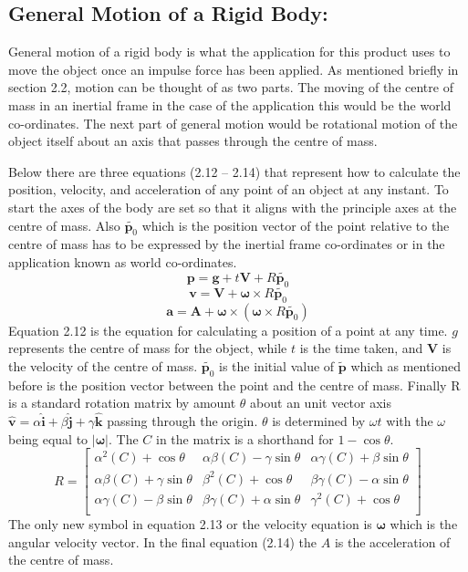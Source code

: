 \subsection{General Motion of a Rigid Body:}
General motion of a rigid body is what the application for this product uses to move the object once an impulse force has been applied.
As mentioned briefly in section 2.2, motion can be thought of as two parts.
The moving of the centre of mass in an inertial frame in the case of the application this would be the world co-ordinates.
The next part of general motion would be rotational motion of the object itself about an axis that passes through the centre of mass. 

Below there are three equations (2.12 – 2.14) that represent how to calculate the position, velocity, and acceleration of any point of an object at any instant.
To start the axes of the body are set so that it aligns with the principle axes at the centre of mass.
Also $\tilde{\mathbf{p}_{0}}$ which is the position vector of the point relative  to the centre of mass has to be expressed by the inertial frame co-ordinates or in the application known as world co-ordinates.
\begin{equation}
\mathbf{p}=\mathbf{g}+t\mathbf{V}+{R}\tilde{\mathbf{p}_{0}}
\end{equation}
\begin{equation}
\mathbf{v}=\mathbf{V}+\boldsymbol\omega\times{R}\tilde{\mathbf{p}_{0}}
\end{equation}
\begin{equation}
\mathbf{a}=\mathbf{A}+\boldsymbol\omega\times(\boldsymbol\omega\times{R}\tilde{\mathbf{p}_{0}})
\end{equation}
Equation 2.12 is the equation for calculating a position of a point at any time. $g$ represents the centre of mass for the object, while $t$ is the time taken, and $\mathbf{V}$ is the velocity of the centre of mass. $\tilde{\mathbf{p}_{0}}$ is the initial value of $\tilde{\mathbf{p}}$ which as mentioned before is the position vector between the point and the centre of mass.
Finally R is a standard rotation matrix by amount $\theta$ about an unit vector axis $\hat{\mathbf{v}} = \alpha\hat{\mathbf{i}} + \beta\hat{\mathbf{j}} + \gamma\hat{\mathbf{k}}$ passing through the origin.
$\theta$ is determined by $\omega t$ with the $\omega$ being equal to $|\boldsymbol{\omega}|$.
The $C$ in the matrix is a shorthand for $1-\cos\theta$.
\begin{equation}\label{ma:Rotation}
R = 
\begin{bmatrix}
  {\alpha}^{2}(C) + \cos\theta & 
  \alpha\beta(C) - \gamma\sin\theta & 
  \alpha\gamma(C) + \beta\sin\theta \\
  
  \alpha\beta(C) + \gamma\sin\theta & 
  {\beta}^{2}(C) + \cos\theta & 
  \beta\gamma(C) - \alpha\sin\theta \\
  
  \alpha\gamma(C) - \beta\sin\theta & 
  \beta\gamma(C) + \alpha\sin\theta & 
  {\gamma}^{2}(C) + \cos\theta \\
\end{bmatrix}
\end{equation}
The only new symbol in equation 2.13 or the velocity equation is $\boldsymbol{\omega}$ which is the angular velocity vector. In the final equation (2.14) the $A$ is the acceleration of the centre of mass.
